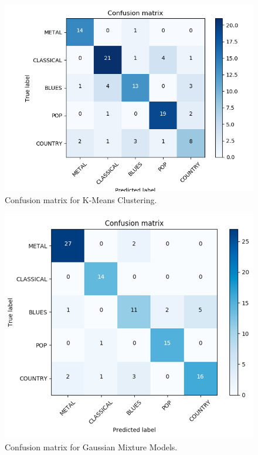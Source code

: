 \begin{figure}
\begin{center}
\includegraphics[scale=0.3]{./figures/confusion_kmeans.png}
\end{center}
\caption
{
Confusion matrix for K-Means Clustering. 
}
\label{fig:big_picture5}
\end{figure}

\begin{figure}
\begin{center}
\includegraphics[scale=0.3]{./figures/confusion_gmm.png}
\end{center}
\caption
{
Confusion matrix for Gaussian Mixture Models. 
}
\label{fig:big_picture5}
\end{figure}

